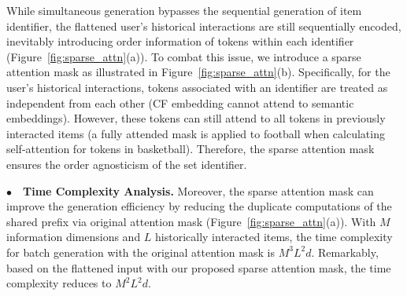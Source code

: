 
While simultaneous generation bypasses the sequential generation of item identifier, the flattened user's historical interactions are still sequentially encoded, inevitably introducing order information of tokens within each identifier (Figure~\ref{fig:sparse_attn}(a)). 
To combat this issue, we introduce a sparse attention mask as illustrated in Figure~\ref{fig:sparse_attn}(b). 
Specifically, for the user's historical interactions, tokens associated with an identifier are treated as independent from each other (\eg CF embedding cannot attend to semantic embeddings). 
However, these tokens can still attend to all tokens in previously interacted items (\eg a fully attended mask is applied to football when calculating self-attention for tokens in basketball).
Therefore, the sparse attention mask ensures the order agnosticism of the set identifier. 

\vspace{2pt}
\noindent$\bullet\quad$\textbf{Time Complexity Analysis.} 
Moreover, the sparse attention mask can improve the generation efficiency by reducing the duplicate computations of the shared prefix via original attention mask (Figure~\ref{fig:sparse_attn}(a)). 
With $M$ information dimensions and $L$ historically interacted items, the time complexity for batch generation with the original attention mask is $M^3L^2d$. 
Remarkably, based on the flattened input with our proposed sparse attention mask, the time complexity reduces to $M^2L^2d$. 

